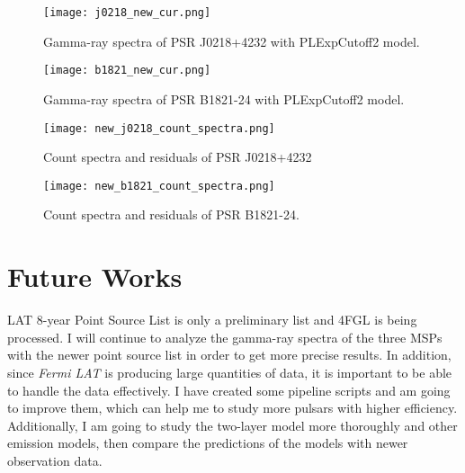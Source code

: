 \documentclass[12pt]{report}
\begin{document}
    \begin{figure}[!htp]
      \centering 
      \texttt{[image: j0218\_new\_cur.png]}
      \caption{Gamma-ray spectra of PSR J0218+4232 with PLExpCutoff2 model.}
      \label{fig: j0218_new_cur}
    \end{figure}

    \begin{figure}[!htp]
      \centering 
      \texttt{[image: b1821\_new\_cur.png]}
      \caption{Gamma-ray spectra of PSR B1821-24 with PLExpCutoff2 model.}
      \label{fig: b1821_new_cur}
    \end{figure}


    \begin{figure}[!htp]
      \centering 
      \texttt{[image: new\_j0218\_count\_spectra.png]}
      \caption{Count spectra and residuals of PSR J0218+4232}
      \label{fig: new_j0218_count_spectra}
    \end{figure}

    \begin{figure}[!htp]
      \centering 
      \texttt{[image: new\_b1821\_count\_spectra.png]}
      \caption{Count spectra and residuals of PSR B1821-24.}
      \label{fig: new_b1821_count_spectra}
    \end{figure}
    

    \section{Future Works}
      LAT 8-year Point Source List is only a preliminary list and 4FGL is being processed. 
      I will continue to analyze the gamma-ray spectra of the three MSPs with the 
      newer point source list in order to get more precise results. In addition, since 
      \textit{Fermi LAT} is producing large quantities of data, it is important to be able 
      to handle the data effectively. I have created some pipeline scripts and am going to
      improve them, which can help me to study more pulsars with higher efficiency.
      Additionally, I am going to study the two-layer model more thoroughly and other 
      emission models, then compare the predictions of the models with newer observation data.





          


\end{document}
